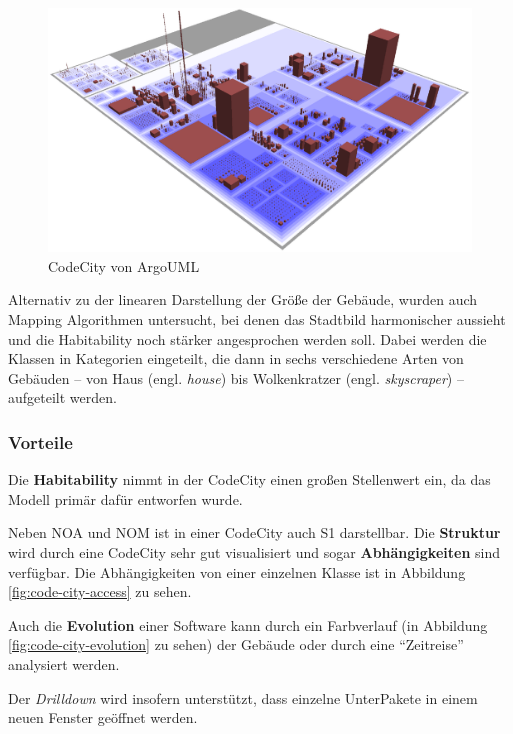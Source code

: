 \begin{figure}[htbp]
	\centering
	\includegraphics[width=\linewidth]{figures/code-city}
	\caption{CodeCity von ArgoUML \cite{wettel2008Visual}} \label{fig:code-city}
\end{figure}

Alternativ zu der linearen Darstellung der Größe der Gebäude, wurden auch Mapping Algorithmen untersucht, bei denen das Stadtbild harmonischer aussieht und die Habitability noch stärker angesprochen werden soll. Dabei werden die Klassen in Kategorien eingeteilt, die dann in sechs verschiedene Arten von Gebäuden -- von Haus (engl. \textit{house}) bis Wolkenkratzer (engl. \textit{skyscraper}) -- aufgeteilt werden.

\subsubsection*{Vorteile}
Die \textbf{Habitability} nimmt in der CodeCity einen großen Stellenwert ein, da das Modell primär dafür entworfen wurde.

Neben NOA und NOM ist in einer CodeCity auch S1 darstellbar. Die \textbf{Struktur} wird durch eine CodeCity sehr gut visualisiert und sogar \textbf{Abhängigkeiten} sind verfügbar. Die Abhängigkeiten von einer einzelnen Klasse ist in Abbildung \ref{fig:code-city-access} zu sehen.

Auch die \textbf{Evolution} einer Software kann durch ein Farbverlauf (in Abbildung \ref{fig:code-city-evolution} zu sehen) der Gebäude oder durch eine "`Zeitreise"' analysiert werden.

Der \textit{Drilldown} wird insofern unterstützt, dass einzelne UnterPakete in einem neuen Fenster geöffnet werden.

